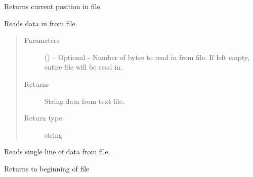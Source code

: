 \documentclass[a4paper,10pt,openany,english]{sphinxmanual}
\begin{document}
\begin{fulllineitems}
\begin{fulllineitems}
\end{fulllineitems}


\begin{fulllineitems}
\label{egadsapi:egads.input.text_file_io.EgadsFile.get_position}
Returns current position in file.

\end{fulllineitems}


\begin{fulllineitems}
\label{egadsapi:egads.input.text_file_io.EgadsFile.read}
Reads data in from file.
\begin{quote}\begin{description}
\item[{Parameters}] \leavevmode
{} () -- Optional - Number of bytes to read in from file. If left empty, entire file will
be read in.

\item[{Returns}] \leavevmode
String data from text file.

\item[{Return type}] \leavevmode
string

\end{description}\end{quote}

\end{fulllineitems}


\begin{fulllineitems}
\label{egadsapi:egads.input.text_file_io.EgadsFile.read_line}
Reads single line of data from file.

\end{fulllineitems}


\begin{fulllineitems}
\label{egadsapi:egads.input.text_file_io.EgadsFile.reset}
Returns to beginning of file


\end{fulllineitems}
\end{fulllineitems}
\end{document}
